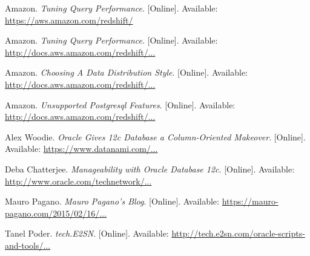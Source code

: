 \documentclass[draftclsnofoot, onecolumn, compsoc, 10pt]{IEEEtran}
\begin{document}
\begin{thebibliography}{9}
Amazon.
\textit{Tuning Query Performance}.
[Online].
Available: \href{https://aws.amazon.com/redshift/}{https://aws.amazon.com/redshift/}

Amazon.
\textit{Tuning Query Performance}.
[Online].
Available: \href{http://docs.aws.amazon.com/redshift/latest/dg/c-optimizing-query-performance.html}{http://docs.aws.amazon.com/redshift/...}

Amazon.
\textit{Choosing A Data Distribution Style}.
[Online].
Available: \href{http://docs.aws.amazon.com/redshift/latest/dg/t_Distributing_data.html}{http://docs.aws.amazon.com/redshift/...}

Amazon.
\textit{Unsupported Postgresql Features}.
[Online].
Available: \href{http://docs.aws.amazon.com/redshift/latest/dg/c_unsupported-postgresql-features.html}{http://docs.aws.amazon.com/redshift/...}

Alex Woodie.
\textit{Oracle Gives 12c Database a Column-Oriented Makeover}.
[Online].
Available: \href{https://www.datanami.com/2013/09/23/oracle_gives_12c_database_a_column-oriented_makeover/}{https://www.datanami.com/...}


Deba Chatterjee.
\textit{Manageability with Oracle Database 12c}.
[Online].
Available: \href{http://www.oracle.com/technetwork/database/manageability/database-manageability-wp-12c-1964677.pdf}{http://www.oracle.com/technetwork/...}

Mauro Pagano.
\textit{Mauro Pagano's Blog}.
[Online].
Available: \href{https://mauro-pagano.com/2015/02/16/sqld360-sql-diagnostics-collection-made-faster/}{https://mauro-pagano.com/2015/02/16/...}

Tanel Poder.
\textit{tech.E2SN}.
[Online].
Available: \href{http://tech.e2sn.com/oracle-scripts-and-tools/session-snapper}{http://tech.e2sn.com/oracle-scripts-and-tools/...}

\end{thebibliography}
\end{document}
